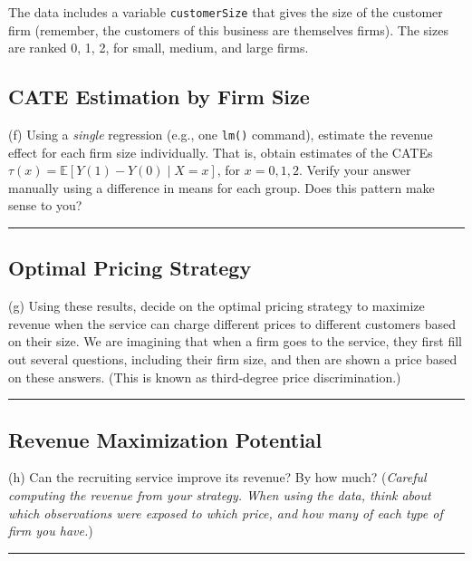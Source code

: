 \documentclass{article}
\newenvironment{colorparagraph}[1]{\par\color{#1}}{\par}
\begin{document}
\begin{colorparagraph}{questioncolor}
The data includes a variable \texttt{customerSize} that gives the size of the customer firm (remember, the customers of this business are themselves firms). The sizes are ranked 0, 1, 2, for small, medium, and large firms.

\label{q3f}\subsection{CATE Estimation by Firm Size}
(f) Using a \emph{single} regression (e.g., one \texttt{lm()} command), estimate the revenue effect for each firm size individually. That is, obtain estimates of the CATEs \( \tau(x) = \mathbb{E}[Y(1) - Y(0) \mid X = x] \), for \( x = 0, 1, 2 \). Verify your answer manually using a difference in means for each group. Does this pattern make sense to you?

\rule{\textwidth}{0.5pt}
\end{colorparagraph}

\begin{colorparagraph}{questioncolor}
\label{q3g}\subsection{Optimal Pricing Strategy}
(g) Using these results, decide on the optimal pricing strategy to maximize revenue when the service can charge different prices to different customers based on their size. We are imagining that when a firm goes to the service, they first fill out several questions, including their firm size, and then are shown a price based on these answers. (This is known as third-degree price discrimination.)

\rule{\textwidth}{0.5pt}
\end{colorparagraph}

\begin{colorparagraph}{questioncolor}
\label{q3h}\subsection{Revenue Maximization Potential}
(h) Can the recruiting service improve its revenue? By how much? (\textit{Careful computing the revenue from your strategy. When using the data, think about which observations were exposed to which price, and how many of each type of firm you have.})

\rule{\textwidth}{0.5pt}
\end{colorparagraph}
\end{document}
